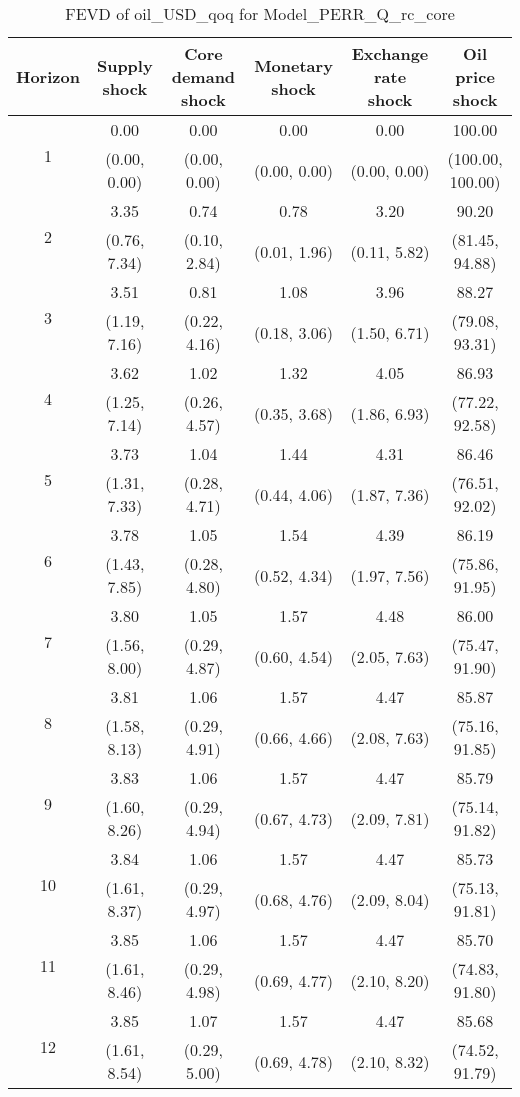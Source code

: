 \documentclass{article}
\begin{document}
\begin{table}
	\footnotesize
	\caption{FEVD of oil_USD_qoq for Model_PERR_Q_rc_core}
	\begin{tabular}{cccccc}
		Horizon & Supply shock & Core demand shock & Monetary shock & Exchange rate shock & Oil price shock\\ \hline
		\multirow{2}{*}{1} & 0.00 & 0.00 & 0.00 & 0.00 & 100.00\\
		 & (0.00, 0.00) & (0.00, 0.00) & (0.00, 0.00) & (0.00, 0.00) & (100.00, 100.00)\\
		\multirow{2}{*}{2} & 3.35 & 0.74 & 0.78 & 3.20 & 90.20\\
		 & (0.76, 7.34) & (0.10, 2.84) & (0.01, 1.96) & (0.11, 5.82) & (81.45, 94.88)\\
		\multirow{2}{*}{3} & 3.51 & 0.81 & 1.08 & 3.96 & 88.27\\
		 & (1.19, 7.16) & (0.22, 4.16) & (0.18, 3.06) & (1.50, 6.71) & (79.08, 93.31)\\
		\multirow{2}{*}{4} & 3.62 & 1.02 & 1.32 & 4.05 & 86.93\\
		 & (1.25, 7.14) & (0.26, 4.57) & (0.35, 3.68) & (1.86, 6.93) & (77.22, 92.58)\\
		\multirow{2}{*}{5} & 3.73 & 1.04 & 1.44 & 4.31 & 86.46\\
		 & (1.31, 7.33) & (0.28, 4.71) & (0.44, 4.06) & (1.87, 7.36) & (76.51, 92.02)\\
		\multirow{2}{*}{6} & 3.78 & 1.05 & 1.54 & 4.39 & 86.19\\
		 & (1.43, 7.85) & (0.28, 4.80) & (0.52, 4.34) & (1.97, 7.56) & (75.86, 91.95)\\
		\multirow{2}{*}{7} & 3.80 & 1.05 & 1.57 & 4.48 & 86.00\\
		 & (1.56, 8.00) & (0.29, 4.87) & (0.60, 4.54) & (2.05, 7.63) & (75.47, 91.90)\\
		\multirow{2}{*}{8} & 3.81 & 1.06 & 1.57 & 4.47 & 85.87\\
		 & (1.58, 8.13) & (0.29, 4.91) & (0.66, 4.66) & (2.08, 7.63) & (75.16, 91.85)\\
		\multirow{2}{*}{9} & 3.83 & 1.06 & 1.57 & 4.47 & 85.79\\
		 & (1.60, 8.26) & (0.29, 4.94) & (0.67, 4.73) & (2.09, 7.81) & (75.14, 91.82)\\
		\multirow{2}{*}{10} & 3.84 & 1.06 & 1.57 & 4.47 & 85.73\\
		 & (1.61, 8.37) & (0.29, 4.97) & (0.68, 4.76) & (2.09, 8.04) & (75.13, 91.81)\\
		\multirow{2}{*}{11} & 3.85 & 1.06 & 1.57 & 4.47 & 85.70\\
		 & (1.61, 8.46) & (0.29, 4.98) & (0.69, 4.77) & (2.10, 8.20) & (74.83, 91.80)\\
		\multirow{2}{*}{12} & 3.85 & 1.07 & 1.57 & 4.47 & 85.68\\
		 & (1.61, 8.54) & (0.29, 5.00) & (0.69, 4.78) & (2.10, 8.32) & (74.52, 91.79)\\
	\end{tabular}
\label{tab:fevd-Model_PERR_Q_rc_core-oil_USD_qoq}
\end{table}
\end{document}
